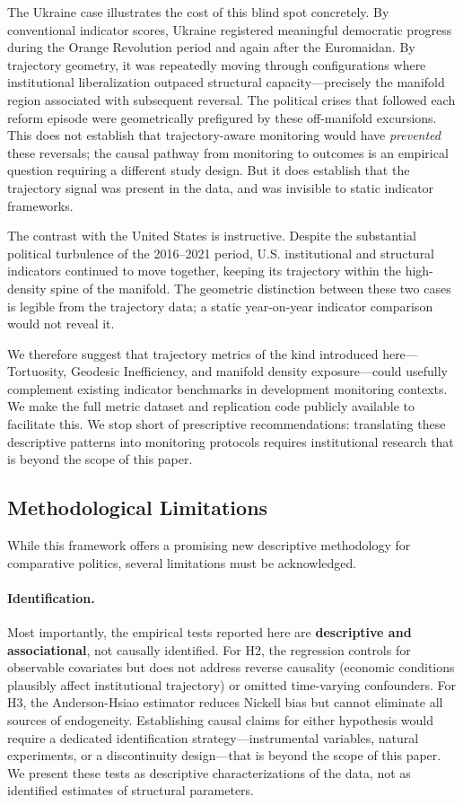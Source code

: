\documentclass[12pt]{article}
\begin{document}
The Ukraine case illustrates the cost of this blind spot concretely. By conventional indicator scores, Ukraine registered meaningful democratic progress during the Orange Revolution period and again after the Euromaidan. By trajectory geometry, it was repeatedly moving through configurations where institutional liberalization outpaced structural capacity---precisely the manifold region associated with subsequent reversal. The political crises that followed each reform episode were geometrically prefigured by these off-manifold excursions. This does not establish that trajectory-aware monitoring would have \textit{prevented} these reversals; the causal pathway from monitoring to outcomes is an empirical question requiring a different study design. But it does establish that the trajectory signal was present in the data, and was invisible to static indicator frameworks.

The contrast with the United States is instructive. Despite the substantial political turbulence of the 2016--2021 period, U.S. institutional and structural indicators continued to move together, keeping its trajectory within the high-density spine of the manifold. The geometric distinction between these two cases is legible from the trajectory data; a static year-on-year indicator comparison would not reveal it.

We therefore suggest that trajectory metrics of the kind introduced here—Tortuosity, Geodesic Inefficiency, and manifold density exposure—could usefully complement existing indicator benchmarks in development monitoring contexts. We make the full metric dataset and replication code publicly available to facilitate this. We stop short of prescriptive recommendations: translating these descriptive patterns into monitoring protocols requires institutional research that is beyond the scope of this paper.

\subsection{Methodological Limitations}
While this framework offers a promising new descriptive methodology for comparative politics, several limitations must be acknowledged.

\paragraph{Identification.} Most importantly, the empirical tests reported here are \textbf{descriptive and associational}, not causally identified. For H2, the regression controls for observable covariates but does not address reverse causality (economic conditions plausibly affect institutional trajectory) or omitted time-varying confounders. For H3, the Anderson-Hsiao estimator reduces Nickell bias but cannot eliminate all sources of endogeneity. Establishing causal claims for either hypothesis would require a dedicated identification strategy—instrumental variables, natural experiments, or a discontinuity design—that is beyond the scope of this paper. We present these tests as descriptive characterizations of the data, not as identified estimates of structural parameters.
\end{document}

